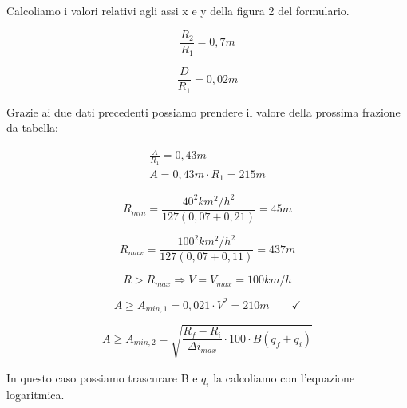 \documentclass[
a4paper,
12pt, 
twoside]{scrbook}
\begin{document}
{{{{{{{{{    \begin{boxF}
    	Calcoliamo i valori relativi agli assi x e y della figura 2 del formulario.
    \end{boxF}
    
    \begin{equation}
    	\frac{R_2}{R_1}=0,7m
    \end{equation}
    
    \begin{equation}
    	\frac{D}{R_1}=0,02m
    \end{equation}
    
    \begin{boxF}
    	Grazie ai due dati precedenti possiamo prendere il valore della prossima frazione da tabella:
    \end{boxF}
    
    \begin{equation}
    	\begin{aligned}
    		\frac{A}{R_1}=0,43m\\
    		A=0,43m\cdot R_1=215m
    	\end{aligned} 	
    \end{equation}
   
    \begin{equation}
    	R_{min}=\frac{40^2km^2/h^2}{127(0,07+0,21)}=45m
    \end{equation}
    
    \begin{equation}
    	R_{max}=\frac{100^2km^2/h^2}{127(0,07+0,11)}=437m
    \end{equation} 	
    
    \begin{equation}
    	R>R_{max}\Rightarrow V=V_{max}=100km/h
    \end{equation} 	
    
    \begin{equation}
    	A\geq A_{min,1}=0,021\cdot V^2=210m\phantom{////} \checkmark
    \end{equation} 	
    
    \begin{equation}
    	A\geq A_{min,2}=\sqrt{\frac{R_f-R_i}{\Delta i_{max}}\cdot 100\cdot B(q_f+q_i)}
    \end{equation} 	
    
    \begin{boxF}
    	In questo caso possiamo trascurare B e $q_i$ la calcoliamo con l'equazione logaritmica.
    \end{boxF}
    
}}}}}}}}}
\end{document}
